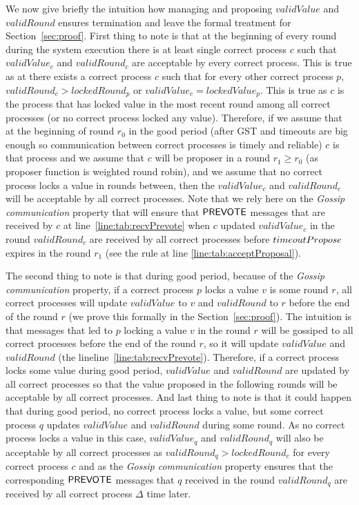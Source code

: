 We now give briefly the intuition how managing and proposing $validValue$ and $validRound$ ensures termination and leave the formal treatment for Section~\ref{sec:proof}.  First thing to note is that at the beginning of every round during the system execution there is at least single correct process $c$ such that $validValue_c$ and $validRound_c$ are acceptable by every correct process. This is true as at there exists a correct process $c$ such that for every other correct process $p$, $validRound_c > lockedRound_p$ or $validValue_c = lockedValue_p$. This is true as $c$ is the process that has locked value in the most recent round among all correct processes (or no correct process locked any value). Therefore, if we assume that at the beginning of round $r_0$ in the good period (after GST and timeouts are big enough so communication between correct processes is timely and reliable) $c$ is that process and we assume that $c$ will be proposer in a round $r_1 \ge r_0$ (as proposer function is weighted round robin), and we assume that no correct process locks a value in rounds between, then the $validValue_c$ and $validRound_c$ will be acceptable by all correct processes. Note that we rely here on the \emph{Gossip communication} property that will ensure that $\mathsf{PREVOTE}$ messages that are received by $c$ at line~\ref{line:tab:recvPrevote} when $c$ updated $validValue_c$ in the round $validRound_c$ are received by all correct processes before $timeoutPropose$ expires in the round $r_1$ (see the rule at line \ref{line:tab:acceptProposal}).   

The second thing to note is that during good period, because of the \emph{Gossip communication} property, if a correct process $p$ locks a value $v$ is some round $r$, all correct processes will update $validValue$ to $v$ and $validRound$ to $r$ before the end of the round $r$ (we prove this formally in the Section~\ref{sec:proof}). The intuition is that messages that led to $p$ locking a value $v$ in the round $r$ will be gossiped to all correct processes before the end of the round $r$, so it will update $validValue$ and $validRound$ (the lineline~\ref{line:tab:recvPrevote}). Therefore, if a correct process locks some value during good period, $validValue$ and $validRound$ are updated by all correct processes so that the value proposed in the following rounds will be acceptable by all correct processes. And last thing to note is that it could happen that during good period, no correct process locks a value, but some correct process $q$ updates $validValue$ and $validRound$ during some round. As no correct process locks a value in this case, $validValue_q$ and $validRound_q$ will also be acceptable by all correct processes as $validRound_q > lockedRound_c$ for every correct process $c$ and as the \emph{Gossip communication} property ensures that the corresponding $\mathsf{PREVOTE}$ messages that $q$ received in the round $validRound_q$ are received by all correct process $\Delta$ time later. 

